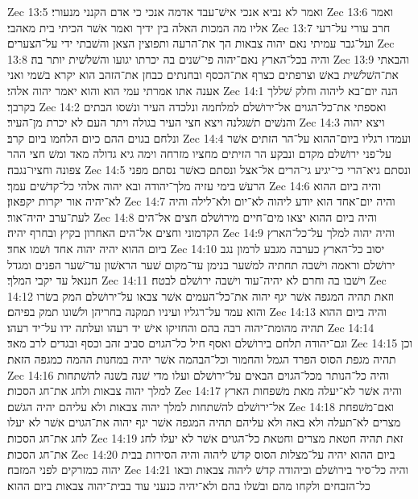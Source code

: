 Zec 13:5  ואמר לא נביא אנכי אישׁ־עבד אדמה אנכי כי אדם הקנני מנעורי׃
Zec 13:6  ואמר אליו מה המכות האלה בין ידיך ואמר אשׁר הכיתי בית מאהבי׃
Zec 13:7  חרב עורי על־רעי ועל־גבר עמיתי נאם יהוה צבאות הך את־הרעה ותפוצין הצאן והשׁבתי ידי על־הצערים׃
Zec 13:8  והיה בכל־הארץ נאם־יהוה פי־שׁנים בה יכרתו יגועו והשׁלשׁית יותר בה׃
Zec 13:9  והבאתי את־השׁלשׁית באשׁ וצרפתים כצרף את־הכסף ובחנתים כבחן את־הזהב הוא יקרא בשׁמי ואני אענה אתו אמרתי עמי הוא והוא יאמר יהוה אלהי׃
Zec 14:1  הנה יום־בא ליהוה וחלק שׁללך בקרבך׃
Zec 14:2  ואספתי את־כל־הגוים אל־ירושׁלם למלחמה ונלכדה העיר ונשׁסו הבתים והנשׁים תשׁגלנה ויצא חצי העיר בגולה ויתר העם לא יכרת מן־העיר׃
Zec 14:3  ויצא יהוה ונלחם בגוים ההם כיום הלחמו ביום קרב׃
Zec 14:4  ועמדו רגליו ביום־ההוא על־הר הזתים אשׁר על־פני ירושׁלם מקדם ונבקע הר הזיתים מחציו מזרחה וימה גיא גדולה מאד ומשׁ חצי ההר צפונה וחציו־נגבה׃
Zec 14:5  ונסתם גיא־הרי כי־יגיע גי־הרים אל־אצל ונסתם כאשׁר נסתם מפני הרעשׁ בימי עזיה מלך־יהודה ובא יהוה אלהי כל־קדשׁים עמך׃
Zec 14:6  והיה ביום ההוא לא־יהיה אור יקרות יקפאון׃
Zec 14:7  והיה יום־אחד הוא יודע ליהוה לא־יום ולא־לילה והיה לעת־ערב יהיה־אור׃
Zec 14:8  והיה ביום ההוא יצאו מים־חיים מירושׁלם חצים אל־הים הקדמוני וחצים אל־הים האחרון בקיץ ובחרף יהיה׃
Zec 14:9  והיה יהוה למלך על־כל־הארץ ביום ההוא יהיה יהוה אחד ושׁמו אחד׃
Zec 14:10  יסוב כל־הארץ כערבה מגבע לרמון נגב ירושׁלם וראמה וישׁבה תחתיה למשׁער בנימן עד־מקום שׁער הראשׁון עד־שׁער הפנים ומגדל חננאל עד יקבי המלך׃
Zec 14:11  וישׁבו בה וחרם לא יהיה־עוד וישׁבה ירושׁלם לבטח׃
Zec 14:12  וזאת תהיה המגפה אשׁר יגף יהוה את־כל־העמים אשׁר צבאו על־ירושׁלם המק בשׂרו והוא עמד על־רגליו ועיניו תמקנה בחריהן ולשׁונו תמק בפיהם׃
Zec 14:13  והיה ביום ההוא תהיה מהומת־יהוה רבה בהם והחזיקו אישׁ יד רעהו ועלתה ידו על־יד רעהו׃
Zec 14:14  וגם־יהודה תלחם בירושׁלם ואסף חיל כל־הגוים סביב זהב וכסף ובגדים לרב מאד׃
Zec 14:15  וכן תהיה מגפת הסוס הפרד הגמל והחמור וכל־הבהמה אשׁר יהיה במחנות ההמה כמגפה הזאת׃
Zec 14:16  והיה כל־הנותר מכל־הגוים הבאים על־ירושׁלם ועלו מדי שׁנה בשׁנה להשׁתחות למלך יהוה צבאות ולחג את־חג הסכות׃
Zec 14:17  והיה אשׁר לא־יעלה מאת משׁפחות הארץ אל־ירושׁלם להשׁתחות למלך יהוה צבאות ולא עליהם יהיה הגשׁם׃
Zec 14:18  ואם־משׁפחת מצרים לא־תעלה ולא באה ולא עליהם תהיה המגפה אשׁר יגף יהוה את־הגוים אשׁר לא יעלו לחג את־חג הסכות׃
Zec 14:19  זאת תהיה חטאת מצרים וחטאת כל־הגוים אשׁר לא יעלו לחג את־חג הסכות׃
Zec 14:20  ביום ההוא יהיה על־מצלות הסוס קדשׁ ליהוה והיה הסירות בבית יהוה כמזרקים לפני המזבח׃
Zec 14:21  והיה כל־סיר בירושׁלם וביהודה קדשׁ ליהוה צבאות ובאו כל־הזבחים ולקחו מהם ובשׁלו בהם ולא־יהיה כנעני עוד בבית־יהוה צבאות ביום ההוא׃


